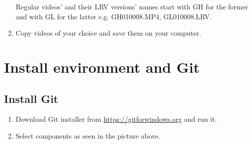 \documentclass[a4paper,12pt]{book}
\begin{document}
\begin{enumerate}
Regular videos’ and their LRV versions’ names start with GH for the former and with GL for the latter e.g. GH010008.MP4, GL010008.LRV. \\
\item Copy videos of your choice and save them on your computer.
\end{enumerate}

\chapter{Install environment and Git}
\section{Install Git}
\begin{enumerate}
	\item Download Git installer from \url{https://gitforwindows.org} and run it.
	\item \begin{minipage}[t]{\linewidth}
		\raggedright
		\medskip	
	\end{minipage}
	Select components as seen in the picture above.
	

\end{enumerate}
\end{document}
